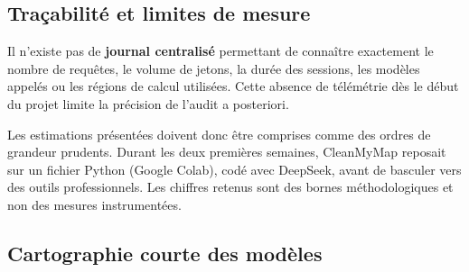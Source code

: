 \documentclass[
  10pt,
  a4paper,
  DIV=11,
  numbers=noendperiod,
  oneside]{scrreprt}
\let\oldtextbf\textbf
\renewcommand{\textbf}[1]{\oldtextbf{\textcolor{cmmnavy}{#1}}}
\begin{document}
\subsection{Traçabilité et limites de
mesure}\label{trauxe7abilituxe9-et-limites-de-mesure}

Il n'existe pas de \textbf{journal centralisé} permettant de connaître
exactement le nombre de requêtes, le volume de jetons, la durée des
sessions, les modèles appelés ou les régions de calcul utilisées. Cette
absence de télémétrie dès le début du projet limite la précision de
l'audit a posteriori.

Les estimations présentées doivent donc être comprises comme des ordres
de grandeur prudents. Durant les deux premières semaines, CleanMyMap
reposait sur un fichier Python (Google Colab), codé avec DeepSeek, avant
de basculer vers des outils professionnels. Les chiffres retenus sont
des bornes méthodologiques et non des mesures instrumentées.

\subsection{Cartographie courte des
modèles}\label{cartographie-courte-des-moduxe8les}
\end{document}
